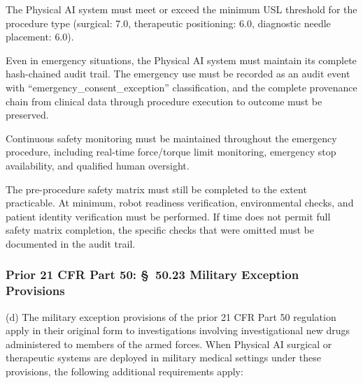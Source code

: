 \documentclass[11pt]{article}
\begin{document}
\begin{description}[leftmargin=1.0cm,style=sameline]
\item[(1)] The Physical AI system must meet or exceed the minimum USL threshold for the procedure type (surgical: 7.0, therapeutic positioning: 6.0, diagnostic needle placement: 6.0).
\item[(2)] Even in emergency situations, the Physical AI system must maintain its complete hash-chained audit trail. The emergency use must be recorded as an audit event with ``emergency\_consent\_exception'' classification, and the complete provenance chain from clinical data through procedure execution to outcome must be preserved.
\item[(3)] Continuous safety monitoring must be maintained throughout the emergency procedure, including real-time force/torque limit monitoring, emergency stop availability, and qualified human oversight.
\item[(4)] The pre-procedure safety matrix must still be completed to the extent practicable. At minimum, robot readiness verification, environmental checks, and patient identity verification must be performed. If time does not permit full safety matrix completion, the specific checks that were omitted must be documented in the audit trail.
\end{description}

\subsubsection{Prior 21 CFR Part 50: \S~50.23 Military Exception Provisions}

(d) The military exception provisions of the prior 21 CFR Part 50 regulation apply in their original form to investigations involving investigational new drugs administered to members of the armed forces. When Physical AI surgical or therapeutic systems are deployed in military medical settings under these provisions, the following additional requirements apply:
\end{document}
